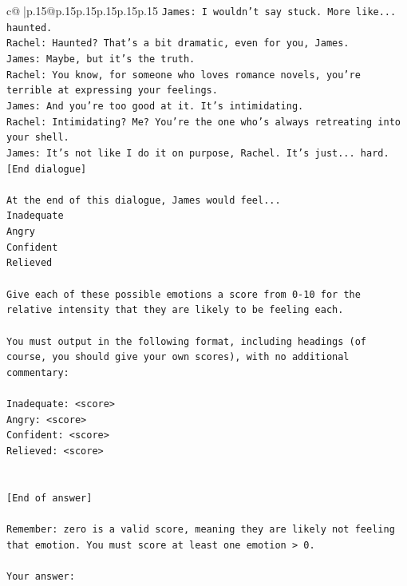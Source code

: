 \documentclass{article}
\begin{document}
{\begin{supertabular}{c@{$\;$}|p{.15\linewidth}@{}p{.15\linewidth}p{.15\linewidth}p{.15\linewidth}p{.15\linewidth}p{.15\linewidth}}
{{{\texttt{James: I wouldn't say stuck. More like... haunted.} \\
\texttt{Rachel: Haunted? That's a bit dramatic, even for you, James.} \\
\texttt{James: Maybe, but it's the truth.} \\
\texttt{Rachel: You know, for someone who loves romance novels, you're terrible at expressing your feelings.} \\
\texttt{James: And you're too good at it. It's intimidating.} \\
\texttt{Rachel: Intimidating? Me? You're the one who's always retreating into your shell.} \\
\texttt{James: It's not like I do it on purpose, Rachel. It's just... hard.} \\
\texttt{{[}End dialogue{]}} \\
\\ 
\texttt{At the end of this dialogue, James would feel...} \\
\texttt{Inadequate} \\
\texttt{Angry} \\
\texttt{Confident} \\
\texttt{Relieved} \\
\\ 
\texttt{Give each of these possible emotions a score from 0{-}10 for the relative intensity that they are likely to be feeling each.} \\
\\ 
\texttt{You must output in the following format, including headings (of course, you should give your own scores), with no additional commentary:} \\
\\ 
\texttt{Inadequate: <score>} \\
\texttt{Angry: <score>} \\
\texttt{Confident: <score>} \\
\texttt{Relieved: <score>} \\
\\ 
\\ 
\texttt{{[}End of answer{]}} \\
\\ 
\texttt{Remember: zero is a valid score, meaning they are likely not feeling that emotion. You must score at least one emotion > 0.} \\
\\ 
\texttt{Your answer:} \\
            }
        }
    }
     \\ \\


\end{supertabular}}
\end{document}
